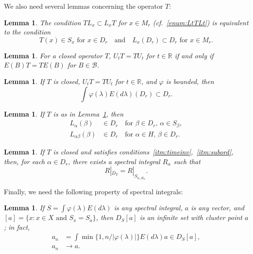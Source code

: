 \documentclass[12pt]{article}
\newtheorem{lemma}[theorem]{Lemma}
\theoremstyle{definition}
\begin{document}
We also need several lemmas concerning the operator $T$:

\begin{lemma}\label{lem:TLTL}
The condition $T L_x \subset L_x T$ for $x\in M_r$ (cf.~\ref{enum:LtTLt}) is equivalent to the condition
\begin{equation}
T(x) \in S_x \text{ for } x\in D_r \quad \text{and} \quad L_x(D_r) \subset D_r \text{ for } x\in M_r.
\label{eq:TLTL}
\end{equation}
\end{lemma}

\begin{lemma}\label{lem:UTTU}
For a closed operator $T$, $U_t T = T U_t$ for $t\in\mathbb{R}$ if and only if $E(B) T = T E(B)$ for $B\in\mathcal{B}$.
\end{lemma}

\begin{lemma}\label{lem:spectralDr}
If $T$ is closed, $U_t T = T U_t$ for $t\in\mathbb{R}$, and $\varphi$ is bounded, then
\begin{equation}
\int \varphi(\lambda) E(d\lambda) (D_r) \subset D_r.
\label{eq:spectralDr}
\end{equation}
\end{lemma}

\begin{lemma}\label{lem:LbetaDr}
If $T$ is as in Lemma~\ref{lem:spectralDr}, then
\begin{align}
L_\alpha(\beta) &\in D_r \quad \text{for } \beta \in D_r,\, \alpha \in S_\beta, \label{eq:LalphaDr}\\
L_{\alpha\beta}(\beta) &\in D_r \quad \text{for } \alpha \in H,\, \beta \in D_r. \label{eq:LalphabetaDr}
\end{align}
\end{lemma}

\begin{lemma}\label{lem:spectralRa}
If $T$ is closed and satisfies conditions~\ref{itm:timeinv},~\ref{itm:subord}, then, for each $\alpha \in D_r$, there exists a spectral integral $R_\alpha$ such that
\begin{equation}
R|_{D_T} = R|_{S_{\alpha, R_\alpha}}.
\label{eq:spectralRa}
\end{equation}
\end{lemma}

Finally, we need the following property of spectral integrals:

\begin{lemma}\label{lem:spectralcluster}
If $S = \int \varphi(\lambda) E(d\lambda)$ is any spectral integral, $a$ is any vector, and $[a] = \{x: x\in X \text{ and } S_x = S_a\}$, then $D_S[a]$ is an infinite set with cluster point $a$; in fact,
\begin{align}
a_n &= \int \min\{1, n/|\varphi(\lambda)|\} E(d\lambda) a \in D_S[a], \label{eq:anDs}\\
a_n &\to a. \label{eq:anconverge}
\end{align}
\end{lemma}
\end{document}
